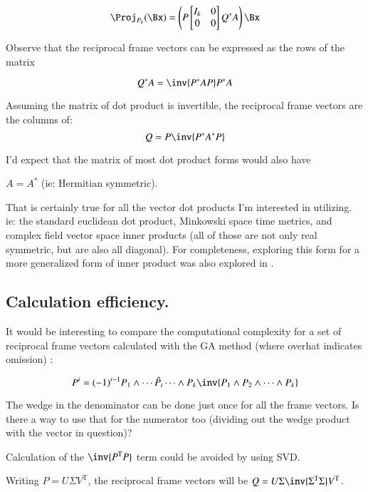 \documentclass{article}      %
\newcommand{\T}[0]{\text{T}}
\begin{document}
\begin{equation}
\Proj_{P_k}(\Bx) =
\left(P
\begin{bmatrix}
I_k & 0 \\
0   & 0 \\
\end{bmatrix}
Q^* A\right) \Bx
\end{equation}

Observe that the reciprocal frame vectors can be expressed as the rows of the matrix

\begin{equation*}
Q^* A = \inv{P^* A P} P^* A
\end{equation*}

Assuming the matrix of dot product is invertible, the reciprocal frame vectors are the columns of:
\begin{equation}
Q = P \inv{P^* A^* P}
\end{equation}

I'd expect that the matrix of most dot product forms would also have 

$A = A^*$ (ie: Hermitian symmetric).

That is certainly true for all the vector dot products
I'm interested in utilizing. ie: the standard euclidean dot product, Minkowski space time metrics,
and complex field vector space inner products (all of those are not only real symmetric, but are also
all diagonal).  For completeness, exploring this form for a more generalized
form of inner product was also explored in \cite{PJprojGen}.

\subsection{ Calculation efficiency. }

It would be interesting to compare the computational complexity for a set of reciprocal frame vectors calculated with the GA method (where overhat indicates omission) :

\[
P^i = (-1)^{i-1} P_1 \wedge \cdots \hat{P_i} \cdots \wedge P_k \inv { P_1 \wedge P_2 \wedge \cdots \wedge P_k }
\]

The wedge in the denominator can be done just once for all the frame vectors.  Is there a way to use that for the numerator too (dividing out the wedge product with the vector in question)?

Calculation of the $\inv{P^\T P}$ term could be avoided by using SVD.

Writing $P = U \Sigma V^\T$, the reciprocal frame vectors will be $Q = U \Sigma \inv{\Sigma^\T \Sigma} V^\T$.
\end{document}
